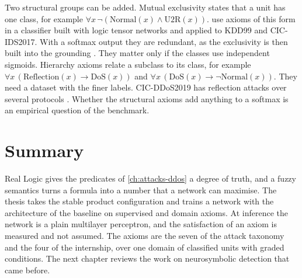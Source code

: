 Two structural groups can be added. Mutual exclusivity states that a unit has
one class, for example $\forall x\,\neg(\mathrm{Normal}(x)\wedge\mathrm{U2R}(x))$.
\citet{onchis2022neurosymbolic} use axioms of this form in a classifier built
with logic tensor networks and applied to KDD99 and CIC-IDS2017. With a softmax
output they are redundant, as the exclusivity is then built into the grounding
\citep{badreddine2022ltn}. They matter only if the classes use independent
sigmoids. Hierarchy axioms relate a subclass to its class, for example
$\forall x\,(\mathrm{Reflection}(x)\rightarrow\mathrm{DoS}(x))$ and
$\forall x\,(\mathrm{DoS}(x)\rightarrow\neg\mathrm{Normal}(x))$. They need a
dataset with the finer labels. CIC-DDoS2019 has reflection attacks over several
protocols \citep{cic2019ddos}. Whether the structural axioms add anything to
a softmax is an empirical question of the benchmark.

\section{Summary}
\label{sec:ch5-summary}

Real Logic gives the predicates of \cref{ch:attacks-ddos} a degree of truth, and
a fuzzy semantics turns a formula into a number that a network can maximise.
The thesis takes the stable product configuration and trains a network with
the architecture of the baseline on supervised and domain axioms. At inference
the network is a plain multilayer perceptron, and the satisfaction of an axiom
is measured and not assumed. The axioms are the seven of the attack
taxonomy and the four of the internship, over one domain of classified units with
graded conditions. The next chapter reviews the work on neurosymbolic detection
that came before.